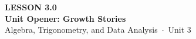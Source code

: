 \documentclass[aspectratio=169, 11pt]{beamer}
\begin{document}
{
\begin{frame}[plain]
  \vspace{2.8cm}\hspace{0.55cm}%
  \begin{minipage}{0.9\textwidth}
    {\color{goldacc}\bfseries\small LESSON 3.0}\\[0.5cm]
    {\color{white}\bfseries\LARGE Unit Opener: Growth Stories}\\[1.2cm]
    {\color{mistmid}\small Algebra, Trigonometry, and Data Analysis~$\cdot$~Unit 3}
  \end{minipage}
\end{frame}
}

\begin{frame}[t, plain]
\end{frame}
\end{document}
